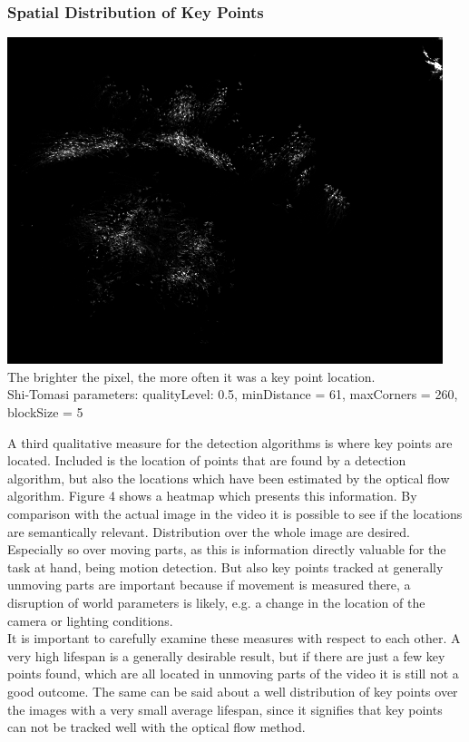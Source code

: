 \documentclass[Bachelorarbeit.tex]{subfiles}
\begin{document}
\subsubsection*{Spatial Distribution of Key Points}
\label{dist}
\begin{center}
	\includegraphics[width=0.5\linewidth]{Images/heat_not_inv}
	 The brighter the pixel, the more often it was a key point location. 
	\\Shi-Tomasi parameters: qualityLevel: 0.5, minDistance = 61, maxCorners = 260, blockSize = 5
	\label{heatmap}
\end{center}
A third qualitative measure for the detection algorithms is where key points are located. Included is the location of points that are found by a detection algorithm, but also the locations which have been estimated by the optical flow algorithm. Figure 4 shows a heatmap which presents this information. By comparison with the actual image in the video it is possible to see if the locations are semantically relevant. Distribution over the whole image are desired. Especially so over moving parts, as this is information directly valuable for the task at hand, being motion detection. But also key points tracked at generally unmoving parts are important because if movement is measured there, a disruption of world parameters is likely, e.g. a change in the location of the camera or lighting conditions. 
\\It is important to carefully examine these measures with respect to each other. A very high lifespan is a generally desirable result, but if there are just a few key points found, which are all located in unmoving parts of the video it is still not a good outcome. The same can be said about a well distribution of key points over the images with a very small average lifespan, since it signifies that key points can not be tracked well with the optical flow method.

\end{document}
